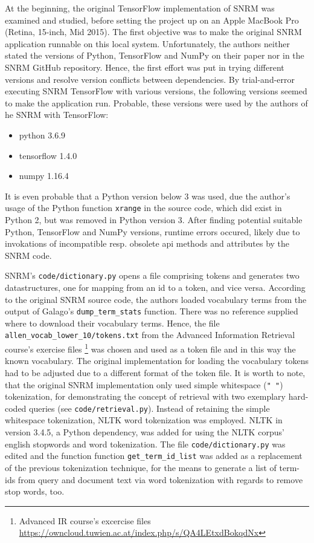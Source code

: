 At the beginning, the original TensorFlow implementation of SNRM was examined and studied,
    before setting the project up on an Apple MacBook Pro (Retina, 15-inch, Mid 2015).
The first objective was to make the original SNRM application runnable on this local system.
Unfortunately, the authors neither stated the versions of Python, TensorFlow and NumPy on their paper nor 
    in the SNRM GitHub repository.
Hence, the first effort was put in trying different versions and resolve version conflicts between dependencies.
By trial-and-error executing SNRM TensorFlow with various versions, the following versions seemed to make the   
    application run.
Probable, these versions were used by the authors of he SNRM with TensorFlow:
\begin{itemize}
    \item python 3.6.9
    \item tensorflow 1.4.0
    \item numpy 1.16.4
\end{itemize}
It is even probable that a Python version below 3 was used, due the author's usage of the Python 
    function \texttt{xrange} in the source code, which did exist in Python 2, but was removed in Python version 3.
After finding potential suitable Python, TensorFlow and NumPy versions, runtime errors occured, likely due to 
    invokations of incompatible resp. obsolete api methods and attributes by the SNRM code.

SNRM's \texttt{code/dictionary.py} opens a file comprising tokens and generates two datastructures, one for mapping 
    from an id to a token, and vice versa.
According to the original SNRM source code, the authors loaded vocabulary terms from the output of 
    Galago's \verb|dump_term_stats| function.
There was no reference supplied where to download their vocabulary terms.
Hence, the file \verb|allen_vocab_lower_10/tokens.txt| from the Advanced Information Retrieval course's exercise files 
    \footnote{Advanced IR course's excercise files \url{https://owncloud.tuwien.ac.at/index.php/s/QA4LEtxdBokqdNx}}
    was chosen and used as a token file and in this way the known vocabulary.
The original implementation for loading the vocabulary tokens had to be adjusted due to a different format of the token file.
It is worth to note, that the original SNRM implementation only used simple whitespace (\verb|" "|) tokenization, 
    for demonstrating the concept of retrieval with two exemplary hard-coded queries (see \texttt{code/retrieval.py}).
Instead of retaining the simple whitespace tokenization, NLTK word tokenization was employed.
NLTK in version 3.4.5, a Python dependency, was added for using the NLTK corpus' english stopwords and word tokenization.
The file \texttt{code/dictionary.py} was edited and the function function \verb|get_term_id_list| was added as a 
    replacement of the previous tokenization technique, for the means to generate a list of term-ids from 
    query and document text via word tokenization with regards to remove stop words, too.

